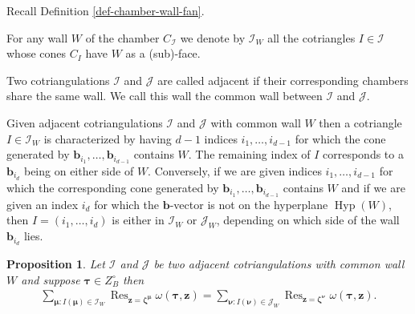 \documentclass[pdftex]{sigma}
\DeclareMathOperator*{\Res}{Res}
\numberwithin{equation}{section}
\newtheorem{Proposition}[Theorem]{Proposition}
 { \theoremstyle{definition}
\newtheorem{Definition}[Theorem]{Definition}
\newtheorem{Note}[Theorem]{Note}
\newtheorem{Example}[Theorem]{Example}
\newtheorem{Remark}[Theorem]{Remark} }
\begin{document}
Recall Definition \ref{def-chamber-wall-fan}.
\begin{Definition}
For any wall $W$ of the chamber $C_{\mathcal{I}}$ we denote by $\mathcal{I}_W$ all the cotriangles $I \in \mathcal{I}$ whose cones $C_I$ have $W$ as a (sub)-face.
\end{Definition}

\begin{Definition}
Two cotriangulations $\mathcal{I}$ and $\mathcal{J}$ are called adjacent if their corresponding chambers share the same wall. We call this wall the common wall between $\mathcal{I}$ and $\mathcal{J}$.
\end{Definition}

Given adjacent cotriangulations $\mathcal{I}$ and $\mathcal{J}$ with common wall $W$ then a cotriangle $I \in \mathcal{I}_W$ is characterized by having $d-1$ indices $i_1,\dots,i_{d-1}$ for which the cone generated by $\bm{b}_{i_1},\dots,\bm{b}_{i_{d-1}}$ contains $W$. The remaining index of $I$ corresponds to a $\bm{b}_{i_d}$ being on either side of $W$. Conversely, if we are given indices $i_1,\dots,i_{d-1}$
for which the corresponding cone generated by $\bm{b}_{i_1},\dots,\bm{b}_{i_{d-1}}$ contains
$W$ and if we are given an index $i_d$ for which the $\bm{b}$-vector is not on the hyperplane
$\operatorname{Hyp}(W)$, then $I = (i_1,\dots,i_{d})$ is either in $\mathcal{I}_W$ or
$\mathcal{J}_W$, depending on which side of the wall $\bm{b}_{i_d}$ lies.


\begin{Proposition}\label{lem-edge-res}
Let $\mathcal{I}$ and $\mathcal{J}$ be two adjacent cotriangulations with common wall $W$ and suppose $\bm\tau \in Z_B^\circ$ then
\begin{gather*}
\sum_{\bm\mu\colon I(\bm{\mu})\in\mathcal{I}_W}\Res_{\bm{z}=\bm\zeta^{\bm\mu}}\omega(\bm{\tau},\bm{z})
=\sum_{\bm\nu\colon I(\bm{\nu})\in\mathcal{J}_W}\Res_{\bm{z}=\bm\zeta^{\bm\nu}}\omega(\bm{\tau},\bm{z}).
\end{gather*}
\end{Proposition}
\end{document}
